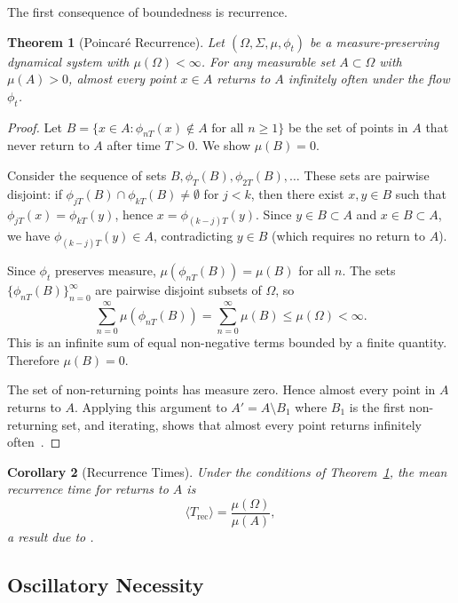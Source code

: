 \documentclass[11pt,twocolumn,a4paper]{article}
\newtheorem{theorem}{Theorem}[section]
\newtheorem{corollary}[theorem]{Corollary}
\theoremstyle{definition}
\theoremstyle{remark}
\begin{document}
The first consequence of boundedness is recurrence.

\begin{theorem}[Poincar\'e Recurrence]
\label{thm:poincare}
Let $(\Omega, \Sigma, \mu, \phi_t)$ be a measure-preserving dynamical system with $\mu(\Omega) < \infty$. For any measurable set $A \subset \Omega$ with $\mu(A) > 0$, almost every point $x \in A$ returns to $A$ infinitely often under the flow $\phi_t$.
\end{theorem}

\begin{proof}
Let $B = \{x \in A : \phi_{nT}(x) \notin A \text{ for all } n \geq 1\}$ be the set of points in $A$ that never return to $A$ after time $T > 0$. We show $\mu(B) = 0$.

Consider the sequence of sets $B, \phi_T(B), \phi_{2T}(B), \ldots$ These sets are pairwise disjoint: if $\phi_{jT}(B) \cap \phi_{kT}(B) \neq \emptyset$ for $j < k$, then there exist $x, y \in B$ such that $\phi_{jT}(x) = \phi_{kT}(y)$, hence $x = \phi_{(k-j)T}(y)$. Since $y \in B \subset A$ and $x \in B \subset A$, we have $\phi_{(k-j)T}(y) \in A$, contradicting $y \in B$ (which requires no return to $A$).

Since $\phi_t$ preserves measure, $\mu(\phi_{nT}(B)) = \mu(B)$ for all $n$. The sets $\{\phi_{nT}(B)\}_{n=0}^{\infty}$ are pairwise disjoint subsets of $\Omega$, so
\[
  \sum_{n=0}^{\infty} \mu(\phi_{nT}(B)) = \sum_{n=0}^{\infty} \mu(B) \leq \mu(\Omega) < \infty.
\]
This is an infinite sum of equal non-negative terms bounded by a finite quantity. Therefore $\mu(B) = 0$.

The set of non-returning points has measure zero. Hence almost every point in $A$ returns to $A$. Applying this argument to $A' = A \setminus B_1$ where $B_1$ is the first non-returning set, and iterating, shows that almost every point returns infinitely often~\citep{poincare1890}.
\end{proof}

\begin{corollary}[Recurrence Times]
\label{cor:kac}
Under the conditions of Theorem~\ref{thm:poincare}, the mean recurrence time for returns to $A$ is
\[
  \langle T_{\mathrm{rec}} \rangle = \frac{\mu(\Omega)}{\mu(A)},
\]
a result due to \citet{kac1947}.
\end{corollary}

\subsection{Oscillatory Necessity}
\label{sec:oscillatory-necessity}
\end{document}
